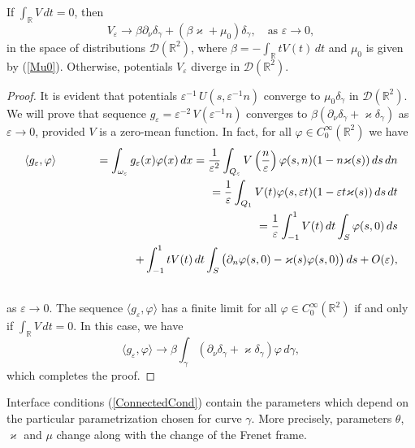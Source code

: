 \documentclass[graybox]{svmult}
\renewcommand{\kappa}{\varkappa}
\newcommand{\Real}{\mathbb R}
\newcommand{\eps}{\varepsilon}
\renewcommand{\phi}{\varphi}
\newcommand{\eqref}[1]{(\ref{#1})}
\begin{document}
\begin{proposition}\label{PropVepsConverg}
If $\int_\Real V\,dt=0$, then
$$
   V_\eps\to \beta\partial_\nu\delta_\gamma+\left(\beta\kappa+\mu_0\right) \delta_\gamma,\quad \mbox{as } \eps\to 0,
$$
in the space of distributions $\mathcal{D}(\Real^2)$, where
$\beta=-\int_\Real t V(t)\,dt$ and $\mu_0$ is given by \eqref{Mu0}.
Otherwise, potentials $V_\eps$ diverge in $\mathcal{D}(\Real^2)$.

\end{proposition}
\begin{proof}
It is evident that potentials $\eps^{-1}\,U\left(s,\eps^{-1}n\right)$
converge to $\mu_0 \delta_\gamma$ in $\mathcal{D}(\Real^2)$.
We will prove that sequence $g_\eps=\eps^{-2}\,V\left(\eps^{-1}n\right)$ converges to
$\beta\left(\partial_\nu\delta_\gamma+\kappa\delta_\gamma\right)$ as $\eps\to 0$, provided $V$ is a zero-mean function.
  In fact, for all $\phi\in C^\infty_0(\Real^2)$ we have
\begin{eqnarray}\nonumber
\langle g_\eps, \phi \rangle&&=\int_{\omega_\eps}g_\eps(x)\phi(x)\,dx
=
\frac{1}{\eps^2}\int_{Q_\eps} V\left(\frac{n}{\eps}\right)\phi(s,n)(1-n\kappa(s))\,ds\,dn
\\\nonumber
&& =
\frac{1}{\eps}\int_{Q_1} V(t)\phi(s,\eps t)(1-\eps t\kappa(s))\,ds\,dt
\\\nonumber
&&=\frac{1}{\eps}\int_{-1}^1 V(t)\,dt \int_S\phi(s,0)\,ds
\\\nonumber
&& \kern60pt
+
\int_{-1}^1 t V(t)\,dt \int_S\big(\partial_n\phi(s,0)-\kappa(s)\phi(s,0)\big)\,ds+O(\eps),
\\\nonumber
\end{eqnarray}
as $\eps\to 0$.
The sequence $\langle g_\eps, \phi \rangle$ has a finite limit for all $\phi\in C^\infty_0(\Real^2)$ if and only if $\int_\Real V\,dt=0$.
In this case, we have
$$
\langle g_\eps, \phi \rangle\to \beta\int_\gamma\left(\partial_\nu\delta_\gamma+\kappa \delta_\gamma\right)\phi\,d\gamma,
$$
which completes the proof.
\end{proof}

Interface conditions \eqref{ConnectedCond} contain the parameters which depend on the particular parametrization chosen for curve $\gamma$. More precisely, parameters $\theta$, $\kappa$ and $\mu$ change along with the change of the Frenet frame.
\end{document}

